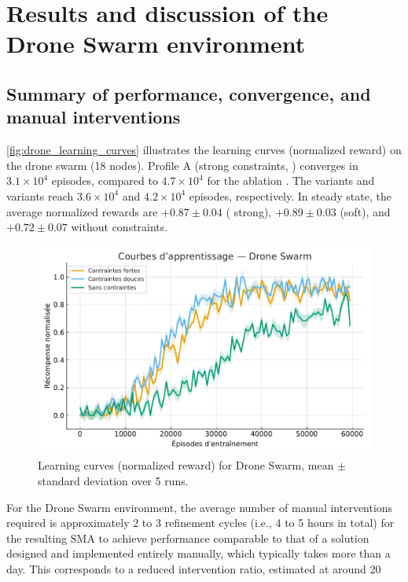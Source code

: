   \section{Results and discussion of the Drone Swarm environment}\label{sec:results_and_discussion_drone_swarm}

  \subsection*{Summary of performance, convergence, and manual interventions}

  \autoref{fig:drone_learning_curves} illustrates the learning curves (normalized reward) on the drone swarm (18 nodes).
  Profile A (strong constraints, ) converges in $3.1\times 10^4$ episodes, compared to $4.7\times 10^4$ for the ablation .
  The variants  and  variants reach $3.6\times 10^4$ and $4.2\times 10^4$ episodes, respectively.
  In steady state, the average normalized rewards are $+0.87 \pm 0.04$ ( strong), $+0.89 \pm 0.03$ (soft), and $+0.72 \pm 0.07$ without constraints.

  \begin{figure}[h!]
    \centering
    \includegraphics[width=0.75\linewidth]{figures/results_drone_learning.pdf}
    \caption[Learning curves (normalized reward) for Drone Swarm]{Learning curves (normalized reward) for Drone Swarm, mean $\pm$ standard deviation over 5 runs.}
    \label{fig:drone_learning_curves}
  \end{figure}

  For the Drone Swarm environment, the average number of manual interventions required is approximately 2 to 3 refinement cycles (i.e., 4 to 5 hours in total) for the resulting SMA to achieve performance comparable to that of a solution designed and implemented entirely manually, which typically takes more than a day. This corresponds to a reduced intervention ratio, estimated at around 20%


